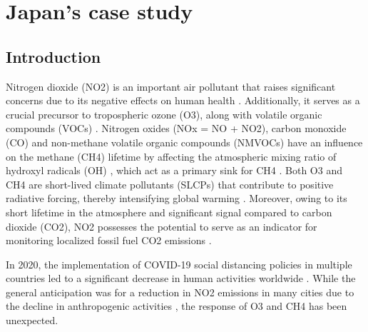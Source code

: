 \chapter{Japan's case study}
\renewcommand{\headrulewidth}{0pt}
\lhead[\thepage]{\leftmark}
\rhead[\leftmark]{\thepage}
\cfoot[]{}

\section{Introduction}
Nitrogen dioxide (NO2) is an important air pollutant that raises significant concerns due to its negative effects on human health \citep{hamra2015lung}. Additionally, it serves as a crucial precursor to tropospheric ozone (O3), along with volatile organic compounds (VOCs) \citep{akimoto2022rethinking}. Nitrogen oxides (NOx = NO + NO2), carbon monoxide (CO) and non-methane volatile organic compounds (NMVOCs) have an influence on the methane (CH4) lifetime by affecting the atmospheric mixing ratio of hydroxyl radicals (OH) \citep{akimoto2022rethinking}, which act as a primary sink for CH4 \citep{turner2019interpreting}. Both O3 and CH4 are short-lived climate pollutants (SLCPs) that contribute to positive radiative forcing, thereby intensifying global warming \citep{akimoto2022rethinking}. Moreover, owing to its short lifetime in the atmosphere and significant signal compared to carbon dioxide (CO2), NO2 possesses the potential to serve as an indicator for monitoring localized fossil fuel CO2 emissions \citep{miyazaki2023predictability}. \par

In 2020, the implementation of COVID-19 social distancing policies in multiple countries led to a significant decrease in human activities worldwide \citep{de2022overview}. While the general anticipation was for a reduction in NO2 emissions in many cities due to the decline in anthropogenic activities \citep{bauwens2020impact,barre2021estimating,cooper2022global}, the response of O3 and CH4 has been unexpected.\par

